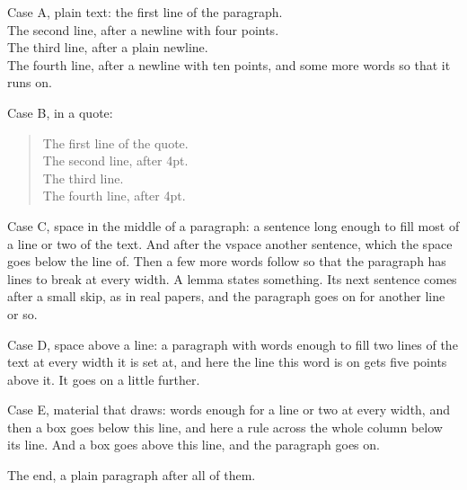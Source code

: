 \documentclass{article}
\begin{document}
Case A, plain text: the first line of the paragraph.\\[4pt]
The second line, after a newline with four points.\\
The third line, after a plain newline.\\[10pt]
The fourth line, after a newline with ten points, and some more words so that it runs on.

Case B, in a quote:
\begin{quote}\small\ttfamily
The first line of the quote.\\[4pt]
The second line, after 4pt.\\
The third line.\\[4pt]
The fourth line, after 4pt.
\end{quote}
Case C, space in the middle of a paragraph: a sentence long enough to fill most of a line or two of the text.
\vspace{6pt} And after the vspace another sentence, which the space goes below the line of. Then a few more words
follow so that the paragraph has lines to break at every width. A lemma states something.\smallskip{} Its next
sentence comes after a small skip, as in real papers, and the paragraph goes on for another line or so.

Case D, space above a line: a paragraph with words enough to fill two lines of the text at every width it is set at,
and here the line this word is on gets five points above it. It goes on a little further.

Case E, material that draws: words enough for a line or two at every width, and then a box
goes below this line, and here a rule\vadjust{\kern3pt\hrule\kern3pt} across the whole column below its line. And a box goes above this line, and the paragraph goes on.

The end, a plain paragraph after all of them.
\end{document}
